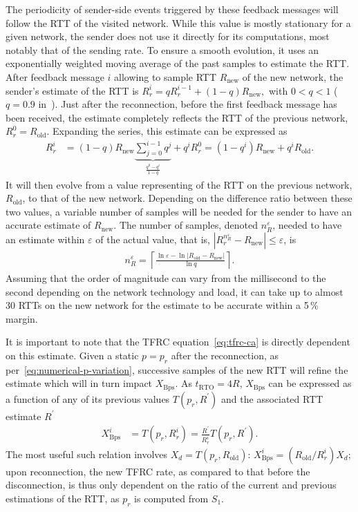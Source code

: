 \documentclass[twocolumn]{nictatechreport}
\begin{document}
The periodicity of sender-side events triggered by these feedback messages will
follow the RTT of the visited network.  While this value is mostly
stationary for a given network, the sender does not use it directly for its
computations, most notably that of the sending rate. To ensure a smooth
evolution, it uses an exponentially weighted moving average of the past samples
to estimate the RTT. After feedback message $i$ allowing to sample RTT
$R_\mathrm{new}$ of the new network, the sender's estimate of the RTT is
$R_r^i = q R_r^{i-1} + (1-q) R_\mathrm{new},$
with $0<q<1$ ($q=0.9$ in~\cite{rfc5348}).  Just after the reconnection, before
the first feedback message has been received, the estimate completely reflects
the RTT of the previous network, $R_r^0 = R_\mathrm{old}$.
Expanding the series, this estimate can be expressed as
\begin{align}
  \label{eq:Rri}
  R_r^i &= (1-q)R_\mathrm{new}\underbrace{\sum_{j=0}^{i-1}q^j}_{\frac{q^0 - q^i}{1-q}} + q^i R_r^0 
  = \left(1-q^i\right)R_\mathrm{new} + q^iR_\mathrm{old}.
\end{align}
It will then evolve from a value representing of the RTT on the previous
network, $R_\mathrm{old}$, to that of the new network. Depending on the
difference ratio between these two values, a variable number of samples will be
needed for the sender to have an accurate estimate of $R_\mathrm{new}$. The
number of samples, denoted $n_R^\varepsilon$, needed to have an estimate within
$\varepsilon$ of the actual value, that is,  $\left| R_r^{n_R^\varepsilon} -
R_\mathrm{new} \right| \le \varepsilon$, is
\begin{gather}
  \label{eq:iRvarepsilon}
  n_R^\varepsilon = \left\lceil\frac{\ln\varepsilon - \ln\left| R_\mathrm{old}-R_\mathrm{new} \right|}{\ln q}\right\rceil.
\end{gather}
Assuming that the order of magnitude can vary from the millisecond to the second
depending on the network technology and load, it can take up to almost 30 RTTs
on the new network for the estimate to be accurate within a 5\,\% margin.

It is important to note that the TFRC equation~\eqref{eq:tfrc-ca} is directly
dependent on this estimate. Given a static $p=p_r$ after the reconnection, as
per~\eqref{eq:numerical-p-variation}, successive samples of the new RTT will
refine the estimate which will in turn impact $X_\mathrm{Bps}$. As
$t_\mathrm{RTO}=4R$, $X_\mathrm{Bps}$ can be expressed as a function of any of
its previous values $T(p_r, R^\prime)$ and the associated RTT estimate $R^\prime$
\begin{align} 
  \label{eq:XiBps}
  X_\mathrm{Bps}^i &= T(p_r, R_r^i) = \frac{R^\prime}{R_r^i} T(p_r, R^\prime).
\end{align}
The most useful such relation involves $X_d=T(p_r,R_\mathrm{old})$:
$X_\mathrm{Bps}^i = (R_\mathrm{old}/R_r^i)X_d$; upon reconnection, the new
TFRC rate, as compared to that before the disconnection, is thus only
dependent on the ratio of the current and previous estimations of the RTT, as
$p_r$ is computed from $S_1$.
\end{document}
